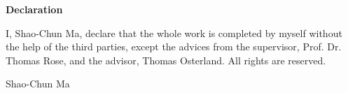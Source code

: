 \thispagestyle{plain}
\vspace*{\fill}
    \begin{center}
        \Large
        \textbf{Declaration}
    \end{center}

    \vspace{1cm}

    I, Shao-Chun Ma, declare that the whole work is completed by myself without the help of the third parties, except the advices from the supervisor, Prof. Dr. Thomas Rose, and the advisor, Thomas Osterland. All rights are reserved.

     Shao-Chun Ma
\vspace*{\fill}
